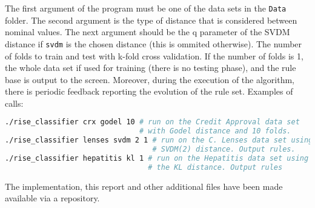 \documentclass[a4paper]{article}
\begin{document}
The first argument of the program must be one of the data sets in the \texttt{Data} folder. The second argument is the type of distance that is considered between nominal values. The next argument should be the q parameter of the SVDM distance if \texttt{svdm} is the chosen distance (this is ommited otherwise). The number of folds to train and test with k-fold cross validation. If the number of folds is 1, the whole data set if used for training (there is no testing phase), and the rule base is output to the screen. Moreover, during the execution of the algorithm, there is periodic feedback reporting the evolution of the rule set. Examples of calls:
\begin{lstlisting}[language=bash,frame=single]
./rise_classifier crx godel 10 # run on the Credit Approval data set
                               # with Godel distance and 10 folds.
./rise_classifier lenses svdm 2 1 # run on the C. Lenses data set using
                                  # SVDM(2) distance. Output rules.
./rise_classifier hepatitis kl 1 # run on the Hepatitis data set using
                                 # the KL distance. Output rules
\end{lstlisting}

The implementation, this report and other additional files have been made available via a repository.



\end{document}
